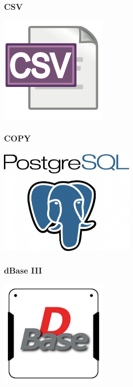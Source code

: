 \documentclass{beamer}
\begin{document}
\begin{frame}
  \frametitle{CSV}


  \begin{center}
    \includegraphics[height=2.1in]{csv_text.png}
  \end{center}
\end{frame}

\begin{frame}
  \frametitle{COPY}


  \begin{center}
    \includegraphics[height=2.1in]{postgres-logo.png}
  \end{center}
\end{frame}

\begin{frame}
  \frametitle{dBase III}


  \begin{center}
    \includegraphics[height=2.1in]{dBase.png}
  \end{center}
\end{frame}
\end{document}
